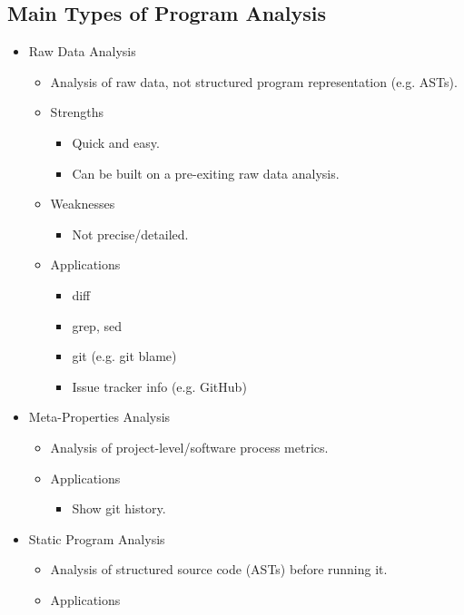 \documentclass{article}
\begin{document}
\subsection{Main Types of Program Analysis}

\begin{itemize}
    \item Raw Data Analysis
    \begin{itemize}
        \item Analysis of raw data, not structured program representation (e.g. ASTs).
        \item Strengths
        \begin{itemize}
            \item Quick and easy.
            \item Can be built on a pre-exiting raw data analysis.
        \end{itemize}
        \item Weaknesses
        \begin{itemize}
            \item Not precise/detailed.
        \end{itemize}
        \item Applications
        \begin{itemize}
            \item diff
            \item grep, sed
            \item git (e.g. git blame)
            \item Issue tracker info (e.g. GitHub)
        \end{itemize}
    \end{itemize}
    \item Meta-Properties Analysis
    \begin{itemize}
        \item Analysis of project-level/software process metrics.
        \item Applications
        \begin{itemize}
            \item Show git history.
        \end{itemize}
    \end{itemize}
    \item Static Program Analysis
    \begin{itemize}
        \item Analysis of structured source code (ASTs) before running it.
        \item Applications

\end{itemize}
\end{itemize}
\end{document}
